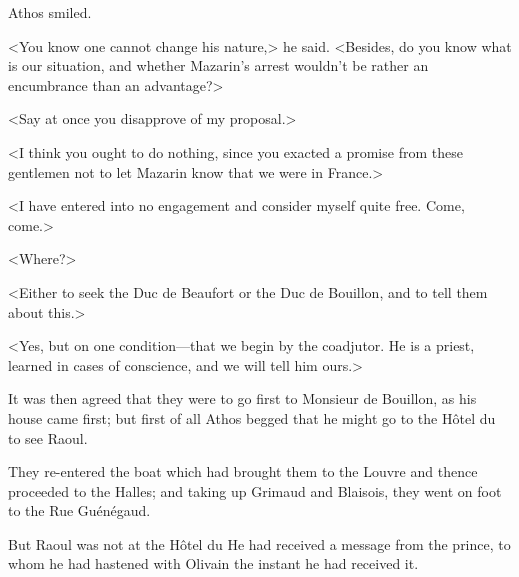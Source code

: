 Athos smiled.

<You know one cannot change his nature,> he said. <Besides, do you know what is our situation, and whether Mazarin's arrest wouldn't be rather an encumbrance than an advantage?>

<Say at once you disapprove of my proposal.>

<I think you ought to do nothing, since you exacted a promise from these gentlemen not to let Mazarin know that we were in France.>

<I have entered into no engagement and consider myself quite free. Come, come.>

<Where?>

<Either to seek the Duc de Beaufort or the Duc de Bouillon, and to tell them about this.>

<Yes, but on one condition—that we begin by the coadjutor. He is a priest, learned in cases of conscience, and we will tell him ours.>

It was then agreed that they were to go first to Monsieur de Bouillon, as his house came first; but first of all Athos begged that he might go to the Hôtel du  to see Raoul.

They re-entered the boat which had brought them to the Louvre and thence proceeded to the Halles; and taking up Grimaud and Blaisois, they went on foot to the Rue Guénégaud.

But Raoul was not at the Hôtel du  He had received a message from the prince, to whom he had hastened with Olivain the instant he had received it. 